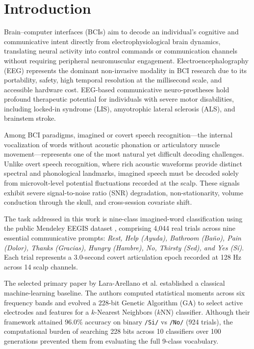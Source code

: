 \documentclass[10pt,twocolumn,a4paper]{article}
\begin{document}
\section{Introduction}
Brain--computer interfaces (BCIs) aim to decode an individual's cognitive and communicative intent directly from electrophysiological brain dynamics, translating neural activity into control commands or communication channels without requiring peripheral neuromuscular engagement. Electroencephalography (EEG) represents the dominant non-invasive modality in BCI research due to its portability, safety, high temporal resolution at the millisecond scale, and accessible hardware cost. EEG-based communicative neuro-prostheses hold profound therapeutic potential for individuals with severe motor disabilities, including locked-in syndrome (LIS), amyotrophic lateral sclerosis (ALS), and brainstem stroke.

Among BCI paradigms, imagined or covert speech recognition—the internal vocalization of words without acoustic phonation or articulatory muscle movement—represents one of the most natural yet difficult decoding challenges. Unlike overt speech recognition, where rich acoustic waveforms provide distinct spectral and phonological landmarks, imagined speech must be decoded solely from microvolt-level potential fluctuations recorded at the scalp. These signals exhibit severe signal-to-noise ratio (SNR) degradation, non-stationarity, volume conduction through the skull, and cross-session covariate shift.

The task addressed in this work is nine-class imagined-word classification using the public Mendeley EEGIS dataset \cite{mendeley_eegis_2025}, comprising 4,044 real trials across nine essential communicative prompts: \textit{Rest, Help (Ayuda), Bathroom (Baño), Pain (Dolor), Thanks (Gracias), Hungry (Hambre), No, Thirsty (Sed), and Yes (Sí)}. Each trial represents a 3.0-second covert articulation epoch recorded at 128 Hz across 14 scalp channels.

The selected primary paper by Lara-Arellano et al. \cite{lara2025feature} established a classical machine-learning baseline. The authors computed statistical moments across six frequency bands and evolved a 228-bit Genetic Algorithm (GA) to select active electrodes and features for a $k$-Nearest Neighbors ($k$NN) classifier. Although their framework attained 96.0\% accuracy on binary \texttt{/Si/} vs \texttt{/No/} (924 trials), the computational burden of searching 228 bits across 10 classifiers over 100 generations prevented them from evaluating the full 9-class vocabulary.
\end{document}
